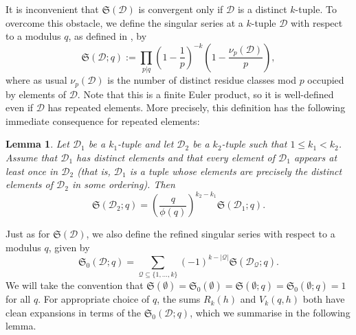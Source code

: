 \documentclass[11pt,letterpaper]{amsart}
\newcommand{\abs}[1]{\left\lvert #1\right\rvert}
\newtheorem{lemma}{Lemma}
\theoremstyle{definition}
\begin{document}
It is inconvenient that $\mathfrak S(\mathcal D)$ is convergent only if $\mathcal D$ is a distinct $k$-tuple. To overcome this obstacle, we define the singular series at a $k$-tuple $\mathcal D$ with respect to a modulus $q$, as defined in \cite{K21}, by
\begin{equation*}
\mathfrak S(\mathcal D;q) := \prod_{p|q}\left(1-\frac 1p\right)^{-k}\left(1-\frac{\nu_p(\mathcal D)}{p}\right),
\end{equation*}
where as usual $\nu_p(\mathcal D)$ is the number of distinct residue classes mod $p$ occupied by elements of $\mathcal D$. Note that this is a finite Euler product, so it is well-defined even if $\mathcal D$ has repeated elements. More precisely, this definition has the following immediate consequence for repeated elements:
\begin{lemma}\label{lem-S-relative-to-q-repeated-elements}
Let $\mathcal D_1$ be a $k_1$-tuple and let $\mathcal D_2$ be a $k_2$-tuple such that $1 \le k_1 < k_2$. Assume that $\mathcal D_1$ has distinct elements and that every element of $\mathcal D_1$ appears at least once in $\mathcal D_2$ (that is, $\mathcal D_1$ is a tuple whose elements are precisely the \emph{distinct} elements of $\mathcal D_2$ in some ordering). Then
\begin{equation*}
\mathfrak S(\mathcal D_2;q) = \left(\frac{q}{\phi(q)}\right)^{k_2-k_1} \mathfrak S(\mathcal D_1;q). 
\end{equation*}
\end{lemma}

Just as for $\mathfrak S(\mathcal D)$, we also define the refined singular series with respect to a modulus $q$, given by
\begin{equation*}
\mathfrak{S}_0(\mathcal{D}; q) = \sum_{\mathcal{Q}\subseteq \{1,\ldots,k\}}(-1)^{k-\abs{\mathcal{Q}}}\mathfrak{S}(\mathcal{D}_{\mathcal{Q}};q).
\end{equation*}
We will take the convention that $\mathfrak S(\emptyset) = \mathfrak S_0(\emptyset) = \mathfrak S(\emptyset;q) = \mathfrak S_0(\emptyset;q) = 1$ for all $q$. For appropriate choice of $q$, the sums $R_k(h)$ and $V_k(q,h)$ both have clean expansions in terms of the $\mathfrak S_0(\mathcal D;q)$, which we summarise in the following lemma.
\end{document}

